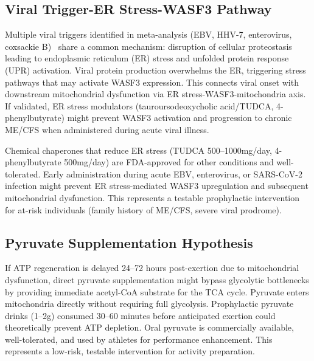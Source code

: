 \subsection{Viral Trigger-ER Stress-WASF3 Pathway}
\label{subsec:viral-er-wasf3}

\begin{hypothesis}
\label{hyp:viral-er-wasf3}
Multiple viral triggers identified in meta-analysis (EBV, HHV-7, enterovirus, coxsackie B)~\cite{hwang2023viral} share a common mechanism: disruption of cellular proteostasis leading to endoplasmic reticulum (ER) stress and unfolded protein response (UPR) activation. Viral protein production overwhelms the ER, triggering stress pathways that may activate WASF3 expression. This connects viral onset with downstream mitochondrial dysfunction via ER stress-WASF3-mitochondria axis. If validated, ER stress modulators (tauroursodeoxycholic acid/TUDCA, 4-phenylbutyrate) might prevent WASF3 activation and progression to chronic ME/CFS when administered during acute viral illness.
\end{hypothesis}

\begin{speculation}
\label{spec:er-stress-prevention}
Chemical chaperones that reduce ER stress (TUDCA 500--1000mg/day, 4-phenylbutyrate 500mg/day) are FDA-approved for other conditions and well-tolerated. Early administration during acute EBV, enterovirus, or SARS-CoV-2 infection might prevent ER stress-mediated WASF3 upregulation and subsequent mitochondrial dysfunction. This represents a testable prophylactic intervention for at-risk individuals (family history of ME/CFS, severe viral prodrome).
\end{speculation}

\subsection{Pyruvate Supplementation Hypothesis}
\label{subsec:pyruvate-supplementation}

\begin{speculation}
\label{spec:pyruvate-supplement}
If ATP regeneration is delayed 24--72 hours post-exertion due to mitochondrial dysfunction, direct pyruvate supplementation might bypass glycolytic bottlenecks by providing immediate acetyl-CoA substrate for the TCA cycle. Pyruvate enters mitochondria directly without requiring full glycolysis. Prophylactic pyruvate drinks (1--2g) consumed 30--60 minutes before anticipated exertion could theoretically prevent ATP depletion. Oral pyruvate is commercially available, well-tolerated, and used by athletes for performance enhancement. This represents a low-risk, testable intervention for activity preparation.
\end{speculation}

